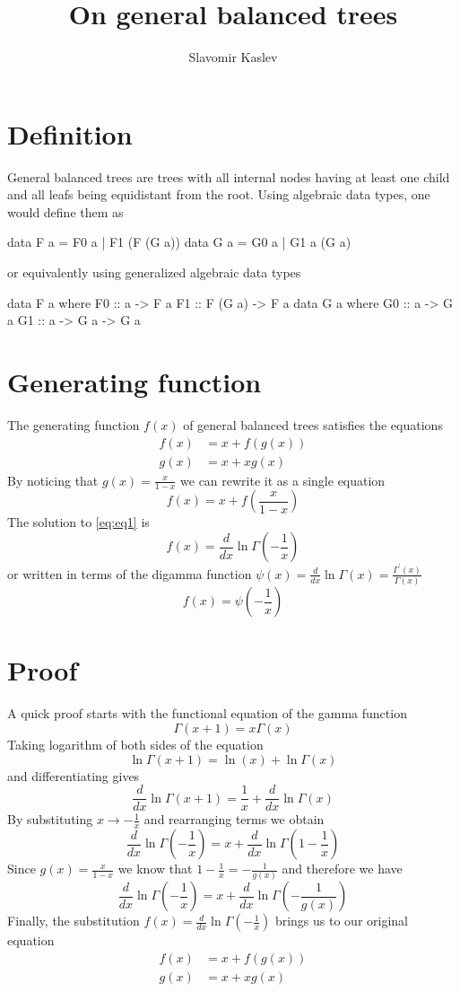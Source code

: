 \documentclass[a4paper]{article}
\title{On general balanced trees}
\author{Slavomir Kaslev}
\begin{document}
\maketitle

\section{Definition}

General balanced trees are trees with all internal nodes having at least one
child and all leafs being equidistant from the root. Using algebraic data types,
one would define them as
\begin{code}
  data F a = F0 a | F1 (F (G a))
  data G a = G0 a | G1 a (G a)
\end{code}
or equivalently using generalized algebraic data types
\begin{code}
  data F a where
    F0 :: a -> F a
    F1 :: F (G a) -> F a
  data G a where
    G0 :: a -> G a
    G1 :: a -> G a -> G a
\end{code}

\section{Generating function}

The generating function $f(x)$ of general balanced trees satisfies the equations
\begin{align*}
  f(x) &= x + f(g(x)) \\
  g(x) &= x + x g(x)
\end{align*}
By noticing that $g(x) = \frac{x}{1-x}$ we can rewrite it as a single equation
\begin{equation}
  f(x) = x + f(\frac{x}{1-x})\label{eq:eq1}
\end{equation}
The solution to \eqref{eq:eq1} is
\begin{equation}
  f(x) = \frac{d}{dx}\ln\Gamma(-\frac{1}{x})\label{eq:eq2}
\end{equation}
or written in terms of the digamma function $\psi(x) = \frac{d}{dx}\ln\Gamma(x)
= \frac{\Gamma^\prime(x)}{\Gamma(x)}$
$$f(x) = \psi(-\frac{1}{x})$$

\section{Proof}

A quick proof starts with the functional equation of the gamma function
$$\Gamma(x+1) = x \Gamma(x)$$
Taking logarithm of both sides of the equation
$$\ln\Gamma(x+1) = \ln(x) + \ln\Gamma(x)$$
and differentiating gives
$$\frac{d}{dx}\ln\Gamma(x+1) = \frac{1}{x} + \frac{d}{dx}\ln\Gamma(x)$$
By substituting $x \to -\frac{1}{x}$ and rearranging terms we obtain
$$\frac{d}{dx}\ln\Gamma(-\frac{1}{x}) = x + \frac{d}{dx}\ln\Gamma(1-\frac{1}{x})$$
Since $g(x) = \frac{x}{1-x}$ we know that $1-\frac{1}{x} = -\frac{1}{g(x)}$ and
therefore we have
$$\frac{d}{dx}\ln\Gamma(-\frac{1}{x}) = x + \frac{d}{dx}\ln\Gamma(-\frac{1}{g(x)})$$
Finally, the substitution $f(x) = \frac{d}{dx}\ln\Gamma(-\frac{1}{x})$ brings us
to our original equation
\begin{align*}
  f(x) &= x + f(g(x)) \\
  g(x) &= x + x g(x)
\end{align*}
\end{document}
